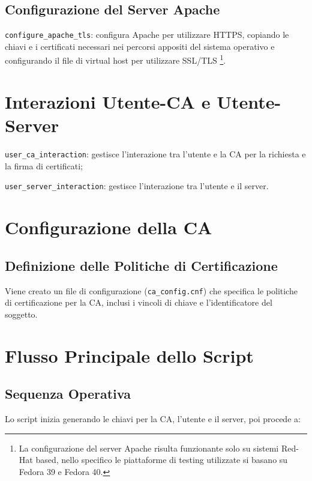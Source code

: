         \subsection{Configurazione del Server Apache}
            \texttt{configure\_apache\_tls}: configura Apache per utilizzare HTTPS, copiando le chiavi e i certificati necessari nei percorsi appositi del sistema operativo e configurando il file di virtual host per utilizzare SSL/TLS \footnote{La configurazione del server Apache risulta funzionante solo su sistemi Red-Hat based, nello specifico le piattaforme di testing utilizzate si basano su Fedora 39 e Fedora 40.}.

    \section{Interazioni Utente-CA e Utente-Server}
        \texttt{user\_ca\_interaction}: gestisce l'interazione tra l'utente e la CA per la richiesta e la firma di certificati;

        \texttt{user\_server\_interaction}: gestisce l'interazione tra l'utente e il server.

    \section{Configurazione della CA}
        \subsection{Definizione delle Politiche di Certificazione}
            Viene creato un file di configurazione (\texttt{ca\_config.cnf}) che specifica le politiche di certificazione per la CA, inclusi i vincoli di chiave e l'identificatore del soggetto.

    \section{Flusso Principale dello Script}
        \subsection{Sequenza Operativa}
            Lo script inizia generando le chiavi per la CA, l'utente e il server, poi procede a:


